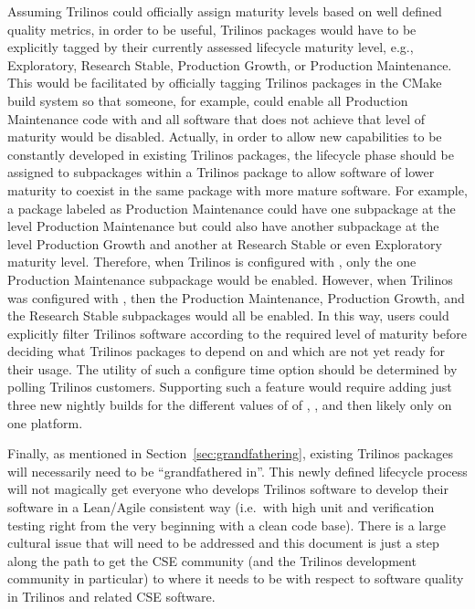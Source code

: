 \documentclass[11pt]{SANDreport}
\begin{document}
Assuming Trilinos could officially assign maturity levels based on
well defined quality metrics, in order to be useful, Trilinos packages
would have to be explicitly tagged by their currently assessed
lifecycle maturity level, e.g., Exploratory, Research Stable,
Production Growth, or Production Maintenance.  This would be
facilitated by officially tagging Trilinos packages in the CMake build
system so that someone, for example, could enable all Production
Maintenance code with
{} and all software that does not achieve that
level of maturity would be disabled.  Actually, in order to allow new
capabilities to be constantly developed in existing Trilinos packages,
the lifecycle phase should be assigned to subpackages within a
Trilinos package to allow software of lower maturity to coexist in the
same package with more mature software.  For example, a package
labeled as Production Maintenance could have one subpackage at the
level Production Maintenance but could also have another subpackage at
the level Production Growth and another at Research Stable or even
Exploratory maturity level.  Therefore, when Trilinos is configured
with {}, only the one Production Maintenance
subpackage would be enabled.  However, when Trilinos was configured
with {}, then the Production Maintenance, Production Growth,
and the Research Stable subpackages would all be enabled.  In this
way, users could explicitly filter Trilinos software according to the
required level of maturity before deciding what Trilinos packages to
depend on and which are not yet ready for their usage.  The utility of
such a configure time option should be determined by polling Trilinos
customers.  Supporting such a feature would require adding just three
new nightly builds for the different values of
{} of
{}, {}, and
{} then likely only on one platform.

Finally, as mentioned in Section~\ref{sec:grandfathering}, existing
Trilinos packages will necessarily need to be ``grandfathered in''.
This newly defined lifecycle process will not magically get everyone
who develops Trilinos software to develop their software in a
Lean/Agile consistent way (i.e.\ with high unit and verification
testing right from the very beginning with a clean code base).  There
is a large cultural issue that will need to be addressed and this
document is just a step along the path to get the CSE community (and
the Trilinos development community in particular) to where it needs to
be with respect to software quality in Trilinos and related CSE
software.
\end{document}
